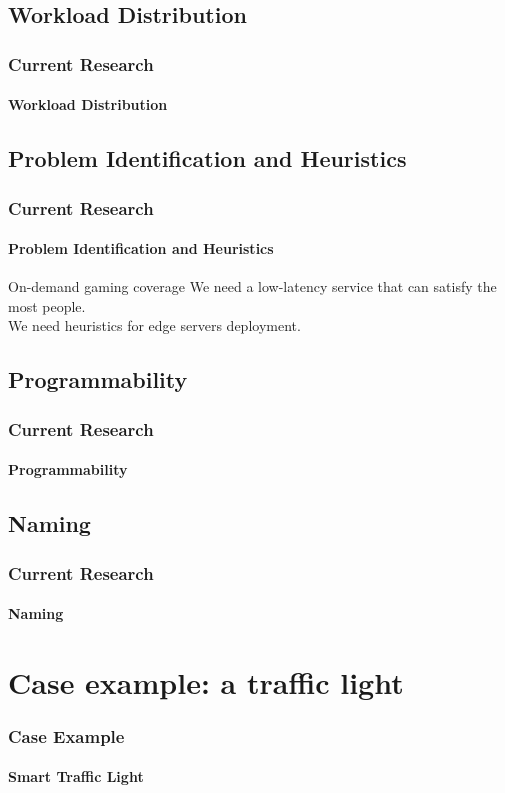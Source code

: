 \documentclass[utf8,xcolor=table, page number]{earlywinter}
\begin{document}
\subsection{Workload Distribution}
\begin{frame}
  \frametitle{Current Research}
  \framesubtitle{Workload Distribution}
\end{frame}
\subsection{Problem Identification and Heuristics}
\begin{frame}
  \frametitle{Current Research}
  \framesubtitle{Problem Identification and Heuristics}
  \begin{exampleblock}{On-demand gaming coverage} %
    We need a low-latency service that can satisfy the most people.\\
    We need heuristics for edge servers deployment.
  \end{exampleblock}
\end{frame}
\subsection{Programmability}
\begin{frame}
  \frametitle{Current Research}
  \framesubtitle{Programmability}
\end{frame}
\subsection{Naming}
\begin{frame}
  \frametitle{Current Research}
  \framesubtitle{Naming}
\end{frame}

\section{Case example: a traffic light}
\begin{frame}
  \frametitle{Case Example}
  \framesubtitle{Smart Traffic Light}
\end{frame}
\end{document}
